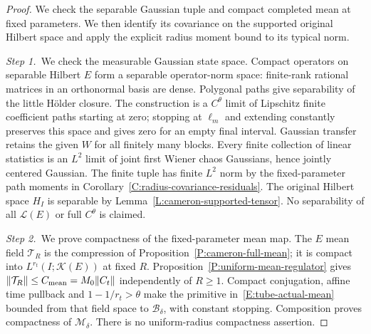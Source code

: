 \begin{proof}
  We check the separable Gaussian tuple and compact completed mean at fixed
  parameters. We then identify its covariance on the supported original
  Hilbert space and apply the explicit radius moment bound to its typical
  norm.


  \medskip
  \noindent\textit{Step 1.~}We check the measurable Gaussian state space.
  Compact operators on separable Hilbert $E$ form a separable operator-norm
  space: finite-rank rational matrices in an orthonormal basis are dense.
  Polygonal paths give separability of the little H\"older closure. The
  construction is a $C^\theta$ limit of Lipschitz finite coefficient paths
  starting at zero; stopping at $\ell_m$ and extending constantly preserves this
  space and gives zero for an empty final interval. Gaussian transfer retains
  the given $W$ for all finitely many blocks. Every finite collection of linear
  statistics is an $L^2$ limit of joint first Wiener chaos Gaussians, hence
  jointly centered Gaussian. The finite tuple has finite $L^2$ norm by the
  fixed-parameter path moments in Corollary~\ref{C:radius-covariance-residuals}.
  The original Hilbert space $H_I$ is separable by
  Lemma~\ref{L:cameron-supported-tensor}. No separability of all
  $\mathcal{L}(E)$ or full $C^\theta$ is claimed.


  \medskip
  \noindent\textit{Step 2.~}We prove compactness of the fixed-parameter mean
  map.
  The $E$ mean field $\mathcal{T}_R$ is the compression of
  Proposition~\ref{P:cameron-full-mean}; it is compact into
  $L^{r_t}(I;\mathcal{K}(E))$ at fixed $R$.
  Proposition~\ref{P:uniform-mean-regulator} gives $\|\mathcal{T}_R\| \le C_{\rm
  mean} = M_0\|C_t\|$ independently of $R \ge 1$. Compact conjugation, affine
  time pullback and $1-1/r_t > \theta$ make the primitive
  in~\eqref{E:tube-actual-mean} bounded from that field space to
  $\mathscr{B}_\delta$, with constant stopping. Composition proves compactness
  of $\mathcal{M}_\delta$. There is no uniform-radius compactness assertion.



\end{proof}

